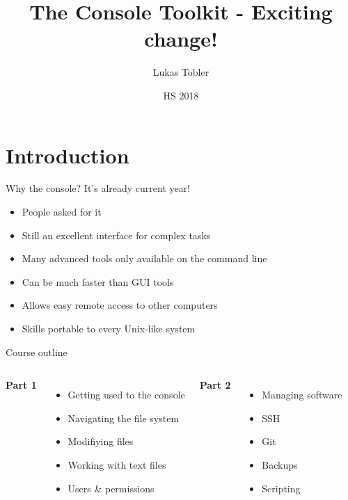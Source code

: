 

\title{The Console Toolkit - Exciting change!}
\author{Lukas Tobler}
\date{HS 2018}


	\begin{frame}
		\titlepage%
	\end{frame}

    \section{Introduction}

    \begin{frame}[t,fragile]{Why the console? It's already current year!}
        \begin{itemize}
            \item People asked for it
            \item Still an excellent interface for complex tasks
            \item Many advanced tools only available on the command line
            \item Can be much faster than GUI tools
            \item Allows easy remote access to other computers
            \item Skills portable to every Unix-like system
        \end{itemize}
    \end{frame}

    \begin{frame}[t,fragile]{Course outline}
        \begin{columns}[T]
            \textbf{Part 1}
            \begin{itemize}
                \item Getting used to the console
                \item Navigating the file system
                \item Modifiying files
                \item Working with text files
                \item{Users \& permissions}
            \end{itemize}
            \textbf{Part 2}
            \begin{itemize}
                \item{Managing software}
                \item{SSH}
                \item{Git}
                \item{Backups}
                \item{Scripting}
            \end{itemize}
        \end{columns}
    \end{frame}


